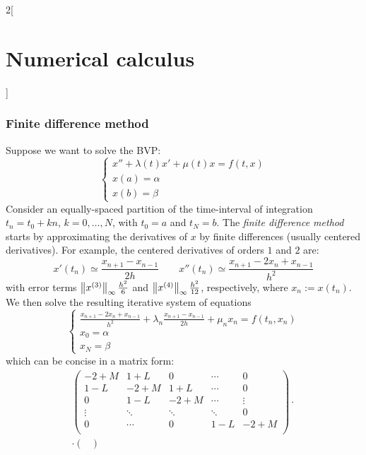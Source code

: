 \documentclass[../../../main_math.tex]{subfiles}
\begin{document}
\begin{multicols}{2}[\section{Numerical calculus}]
  \subsubsection{Finite difference method}
  \begin{definition}
    Suppose we want to solve the BVP:
    \begin{equation}\label{NC:eq_finitediff}
      \begin{cases}
        x'' + \lambda(t) x'+\mu(t) x=f(t, x) \\
        x(a)=\alpha                          \\
        x(b)=\beta
      \end{cases}
    \end{equation}
    Consider an equally-spaced partition of the time-interval of integration $t_n= t_0+kn$, $k=0,\ldots,N$, with $t_0=a$ and $t_N=b$. The \emph{finite difference method} starts by approximating the derivatives of $x$ by finite differences (usually centered derivatives). For example, the centered derivatives of orders $1$ and $2$ are:
    $$
      x'(t_n)\simeq\frac{x_{n+1}-x_{n-1}}{2h}\qquad x''(t_n)\simeq\frac{x_{n+1}-2x_n+x_{n-1}}{h^2}
    $$
    with error terms $\left\|x^{(3)}\right\|_\infty\frac{h^2}{6}$ and $\left\|x^{(4)}\right\|_\infty \frac{h^2}{12}$, respectively, where $x_n:=x(t_n)$. We then solve the resulting iterative system of equations
    $$
      \begin{cases}
        \displaystyle\frac{x_{n+1}-2x_n+x_{n-1}}{h^2} \!+\! \lambda_n \frac{x_{n+1}-x_{n-1}}{2h}\!+\!\mu_n x_n\!=\!f(t_n, x_n) \\
        x_0=\alpha                                                                                                             \\
        x_N=\beta
      \end{cases}
    $$
    which can be concise in a matrix form:
    \begin{multline*}
      \begin{pmatrix}
        -2+M   & 1+ L   & 0      & \cdots & 0      \\
        1-L    & -2+M   & 1+L    & \cdots & 0      \\
        0      & 1-L    & -2+M   & \cdots & \vdots \\
        \vdots & \ddots & \ddots & \ddots & 0      \\
        0      & \cdots & 0      & 1-L    & -2+M   \\
      \end{pmatrix}\cdot\\\cdot\begin{pmatrix}

\end{pmatrix}
\end{multline*}
\end{definition}
\end{multicols}
\end{document}
